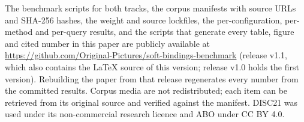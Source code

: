 The benchmark scripts for both tracks, the corpus manifests with source URLs and SHA-256 hashes, the weight and source lockfiles, the per-configuration, per-method and per-query results, and the scripts that generate every table, figure and cited number in this paper are publicly available at \url{https://github.com/Original-Pictures/soft-bindings-benchmark} (release v1.1, which also contains the LaTeX source of this version; release v1.0 holds the first version). Rebuilding the paper from that release regenerates every number from the committed results. Corpus media are not redistributed; each item can be retrieved from its original source and verified against the manifest. DISC21 was used under its non-commercial research licence and ABO under CC BY 4.0.

